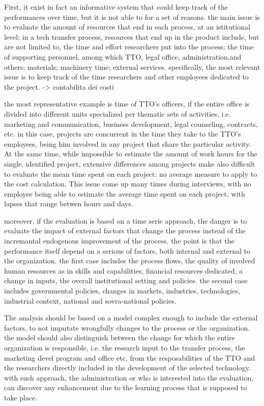 First, it exist in fact an informative system that could keep track of the performances over time, but it is not able to for a set of reasons. the main issue is to evaluate the amount of resources that end in each process, at an istitutional level: in a tech transfer process, resources that end up in the product include, but are not limited to, the time and effort researchers put into the process; the time of supporting personnel, among which TTO, legal office, administration,and others; materials; machinery time; external services. specifically, the most relevant issue is to keep track of the time researchers and other employees dedicated to the project. -> contabilita dei costi

the most representative example is time of TTO's officers, if the entire office is divided into different units specialized per thematic sets of activities, i.e. marketing and communication, business development, legal counseling, contracts, etc. in this case, projects are concurrent in the time they take to the TTO's employees, being him involved in any project that share the particular activity. At the same time, while impossible to estimate the amount of work hours for the single, identified project, extensive differences among projects make also difficult to evaluate the mean time spent on each project: no average measure to apply to the cost calculation. This issue come up many times during interviews, with no employee being able to estimate the average time spent on each project, with lapses that range betwen hours and days.

moreover, if the evaluation is based on a time serie approach, the danger is to evaluate the impact of external factors that change the process instead of the incremantal endogenous improvement of the process. the point is that the performance itself depend on a serious of factors, both internal and external to the organization. the first case includes the process flows, the quality of involved human resources as in skills and capabilities, financial resources dedicated, a change in inputs, the overall institutional setting and policies. the second case includes governmental policies, changes in markets, industries, technologies, industrial context, national and sovra-national policies. 

The analysis should be based on a model complex enough to include the external factors, to not imputate wrongfully changes to the process or the organization. the model should also distinguish between the change for which the entire organization is responsible, i.e. the research input to the transfer process, the marketing devel program and office etc, from the resposabilities of the TTO and the researchers directly included in the development of the selected technology. with such approach, the administration or who is interested into the evaluation, can discover any enhancement due to the learning process that is supposed to take place. 

